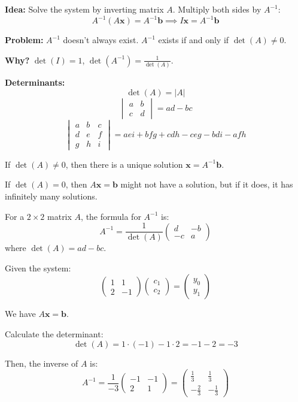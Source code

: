 \documentclass{article}
\begin{document}
\textbf{Idea:} Solve the system by inverting matrix \( A \). Multiply both sides by \( A^{-1} \):
\[
A^{-1} (A \mathbf{x}) = A^{-1} \mathbf{b} \implies I \mathbf{x} = A^{-1} \mathbf{b}
\]

\textbf{Problem:} \( A^{-1} \) doesn't always exist. \( A^{-1} \) exists if and only if \( \det(A) \neq 0 \).

\textbf{Why?} \( \det(I) = 1 \), \( \det(A^{-1}) = \frac{1}{\det(A)} \).

\textbf{Determinants:}
\[
\det(A) = |A|
\]
\[
\begin{vmatrix}
a & b \\
c & d
\end{vmatrix}
= ad - bc
\]
\[
\begin{vmatrix}
a & b & c \\
d & e & f \\
g & h & i
\end{vmatrix}
= aei + bfg + cdh - ceg - bdi - afh
\]

If \( \det(A) \neq 0 \), then there is a unique solution \( \mathbf{x} = A^{-1} \mathbf{b} \).

If \( \det(A) = 0 \), then \( A\mathbf{x} = \mathbf{b} \) might not have a solution, but if it does, it has infinitely many solutions.

For a \( 2 \times 2 \) matrix \( A \), the formula for \( A^{-1} \) is:
\[
A^{-1} = \frac{1}{\det(A)} \begin{pmatrix}
d & -b \\
-c & a
\end{pmatrix}
\]
where \( \det(A) = ad - bc \).

Given the system:
\[
\begin{pmatrix}
1 & 1 \\
2 & -1
\end{pmatrix}
\begin{pmatrix}
c_1 \\
c_2
\end{pmatrix}
=
\begin{pmatrix}
y_0 \\
y_1
\end{pmatrix}
\]

We have \( A\mathbf{x} = \mathbf{b} \).

Calculate the determinant:
\[
\det(A) = 1 \cdot (-1) - 1 \cdot 2 = -1 - 2 = -3
\]

Then, the inverse of \( A \) is:
\[
A^{-1} = \frac{1}{-3} \begin{pmatrix}
-1 & -1 \\
2 & 1
\end{pmatrix}
= \begin{pmatrix}
\frac{1}{3} & \frac{1}{3} \\
-\frac{2}{3} & -\frac{1}{3}
\end{pmatrix}
\]
\end{document}
